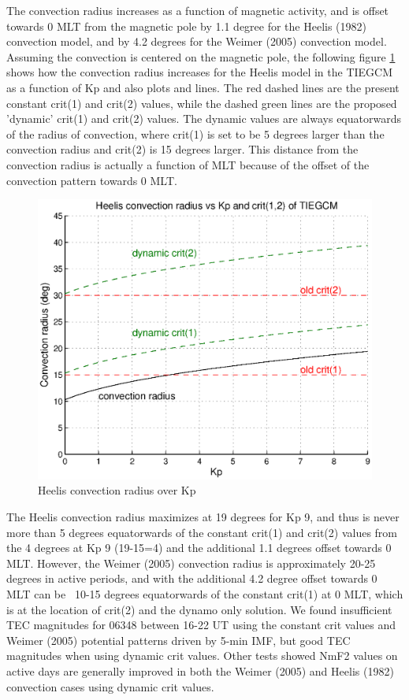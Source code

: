 The convection radius increases as a function of magnetic activity, and is offset 
towards 0 MLT from the magnetic pole by 1.1 degree for the Heelis (1982) \cite{heelis1982} convection 
model, and by 4.2 degrees for the Weimer (2005) \cite{Weimer2005} convection model.  Assuming the 
convection is centered on the magnetic pole, the following figure \ref{fig:convec_radius_Heelis} shows how the 
convection radius increases for the Heelis model in the TIEGCM as a function of Kp 
and also plots  and  lines.  The red dashed lines are the present 
constant crit(1) and crit(2) values, while the dashed green lines are the proposed 
'dynamic' crit(1) and crit(2) values.  The dynamic values are always equatorwards of 
the radius of convection, where crit(1) is set to be 5 degrees larger than the 
convection radius and crit(2) is 15 degrees larger.  This distance from the 
convection radius is actually a function of MLT because of the offset of the 
convection pattern towards 0 MLT. \\

%
\begin{figure}
  \centering
  \includegraphics[scale=0.7]{./tex_plot/crad_kp_may11.eps}
  \caption{Heelis convection radius over Kp}
   \label{fig:convec_radius_Heelis}
\end{figure}
%
The Heelis convection radius maximizes at 19 degrees for Kp 9, and thus is never more than 
5 degrees equatorwards of the constant crit(1) and crit(2) values from the 4 degrees at Kp 9 
(19-15=4) and the additional 1.1 degrees offset towards 0 MLT.  However, the Weimer (2005) 
convection radius is approximately 20-25 degrees in active periods, and with the additional 
4.2 degree offset towards 0 MLT can be ~10-15 degrees equatorwards of the constant crit(1) at 
0 MLT, which is at the location of crit(2) and the dynamo only solution.  We found insufficient 
TEC magnitudes for 06348 between 16-22 UT using the constant crit values and Weimer (2005) 
potential patterns driven by 5-min IMF, but good TEC magnitudes when using dynamic crit values.  
Other tests showed NmF2 values on active days are generally improved in both the Weimer (2005) 
and Heelis (1982) convection cases using dynamic crit values.  \\

